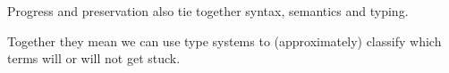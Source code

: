 \begin{frame}[c]
  Progress and preservation also tie together syntax, semantics and typing.
\end{frame}

\begin{frame}[c]
  Together they mean we can use type systems to (approximately) classify which terms will or will not get stuck.
\end{frame}
